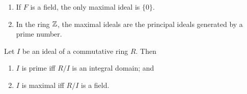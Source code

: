 \begin{example}
    \begin{enumerate}
        \item If $F$ is a field, the only maximal ideal is $\{0\}$.

        \item In the ring $\mathbb{Z}$, 
            the maximal ideals are the principal ideals generated by a prime number.
    \end{enumerate}
\end{example}

\begin{proposition}[]
    Let $I$ be an ideal of a commutative ring $R$. Then
    \begin{enumerate}
        \item $I$ is prime iff $R/I$ is an integral domain; and
        \item $I$ is maximal iff $R/I$ is a field.
    \end{enumerate}
\end{proposition}

